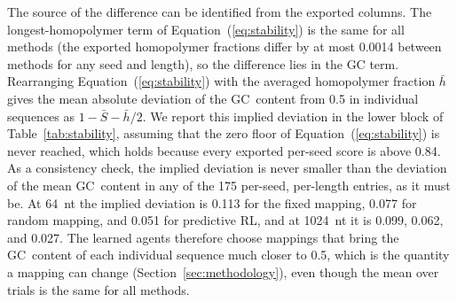 \documentclass[entropy,article,submit,moreauthors]{Definitions/mdpi}
\begin{document}
The source of the difference can be identified from the exported columns. The longest-homopolymer term of Equation~(\ref{eq:stability}) is the same for all methods (the exported homopolymer fractions differ by at most 0.0014 between methods for any seed and length), so the difference lies in the GC term. Rearranging Equation~(\ref{eq:stability}) with the averaged homopolymer fraction $\bar{h}$ gives the mean absolute deviation of the GC~content from 0.5 in individual sequences as $1 - \bar{S} - \bar{h}/2$. We report this implied deviation in the lower block of Table~\ref{tab:stability}, assuming that the zero floor of Equation~(\ref{eq:stability}) is never reached, which holds because every exported per-seed score is above 0.84. As a consistency check, the implied deviation is never smaller than the deviation of the mean GC~content in any of the 175 per-seed, per-length entries, as it must be. At 64~nt the implied deviation is 0.113 for the fixed mapping, 0.077 for random mapping, and 0.051 for predictive RL, and at 1024~nt it is 0.099, 0.062, and 0.027. The learned agents therefore choose mappings that bring the GC~content of each individual sequence much closer to 0.5, which is the quantity a mapping can change (Section~\ref{sec:methodology}), even though the mean over trials is the same for all methods.
\end{document}
